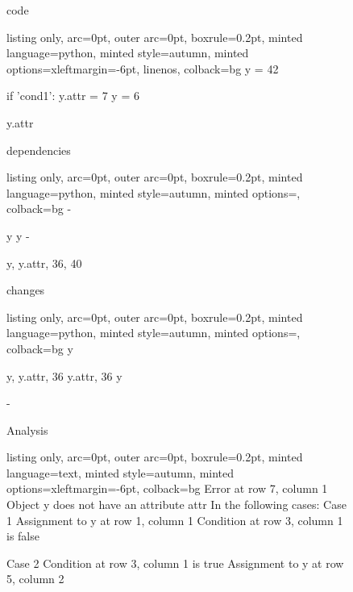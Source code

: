 \begin{figure}[!h]
 \begin{minipage}{0.32\textwidth}
 code
  \begin{tcblisting}{listing only, 
    arc=0pt,
    outer arc=0pt, 
    boxrule=0.2pt,
    minted language=python,
    minted style=autumn,
    minted options={xleftmargin=-6pt, linenos},
    colback=bg }
y = 42

if 'cond1':
  y.attr = 7
  y = 6

y.attr
\end{tcblisting}
 \end{minipage}
 \begin{minipage}{0.32\textwidth}
 dependencies
  \begin{tcblisting}{listing only, 
    arc=0pt,
    outer arc=0pt, 
    boxrule=0.2pt,
    minted language=python,
    minted style=autumn,
    minted options={},
    colback=bg }
-

y
y
-

y, y.attr, 36, 40
\end{tcblisting}
 \end{minipage}
 \begin{minipage}{0.32\textwidth}
 changes
  \begin{tcblisting}{listing only, 
    arc=0pt,
    outer arc=0pt, 
    boxrule=0.2pt,
    minted language=python,
    minted style=autumn,
    minted options={},
    colback=bg }
y

y, y.attr, 36
y.attr, 36
y

-
\end{tcblisting}
 \end{minipage}
 \begin{minipage}{\textwidth}
  \vspace{4pt}
  Analysis
  \begin{tcblisting}{listing only, 
    arc=0pt,
    outer arc=0pt, 
    boxrule=0.2pt,
    minted language=text,
    minted style=autumn,
    minted options={xleftmargin=-6pt},
    colback=bg }
Error at row 7, column 1
 Object y does not have an attribute attr
 In the following cases:
 Case 1
  Assignment to y at row 1, column 1
  Condition at row 3, column 1 is false

 Case 2
  Condition at row 3, column 1 is true
  Assignment to y at row 5, column 2
\end{tcblisting}
 \end{minipage}
 \label{lst:assign}
\end{figure}